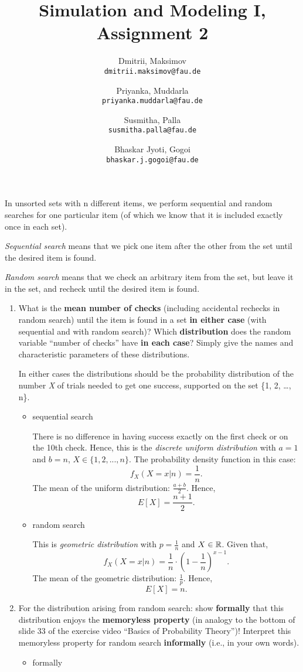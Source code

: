 \documentclass{homework}
\title{Simulation and Modeling I, Assignment 2}
\author{
  Dmitrii, Maksimov\\
  \texttt{dmitrii.maksimov@fau.de}
  \and
  Priyanka, Muddarla\\
  \texttt{priyanka.muddarla@fau.de}
  \and
  Susmitha, Palla\\
  \texttt{susmitha.palla@fau.de}
  \and
  Bhaskar Jyoti, Gogoi\\
  \texttt{bhaskar.j.gogoi@fau.de}
}
\begin{document}
\maketitle

\exercise
In unsorted sets with n different items, we perform sequential and random searches for one particular item (of which we know that it is included exactly once in each set).

\emph{Sequential search} means that we pick one item after the other from the set until the desired item is found.

\emph{Random search} means that we check an arbitrary item from the set, but leave it in the set, and recheck until the desired item is found.

\begin{enumerate}
	\item What is the \textbf{mean number of checks} (including accidental rechecks in random search) until the item is found in a set \textbf{in either case} (with sequential and with random search)? Which \textbf{distribution} does the random variable “number of checks” have \textbf{in each case}? Simply give the names and characteristic parameters of these distributions.

	In either cases the distributions should be the probability distribution of the number \emph{X} of trials needed to get one success, supported on the set \{1, 2, \dots, n\}.	
	\begin{itemize}
		\item sequential search
		
		There is no difference in having success exactly on the first check or on the 10th check. Hence, this is the \emph{discrete uniform distribution} with $a = 1$ and $b = n$, $X \in \{1, 2, ..., n\}$. The probability density function in this case: \[f_X(X = x|n) = \frac{1}{n}.\]
		The mean of the uniform distribution: $\frac{a+b}{2}$. Hence, \[E[X] = \frac{n+1}{2}.\]
		\item random search

		This is \emph{geometric distribution} with $p = \frac{1}{n}$ and $X \in \mathbb R$. Given that, \[f_X(X = x|n) = \frac{1}{n}\cdot (1 - \frac{1}{n}) ^ {x - 1}.\]
		The mean of the geometric distribution: $\frac{1}{p}$. Hence, \[E[X] = n.\]
	\end{itemize}
	\item For the distribution arising from random search: show \textbf{formally} that this distribution enjoys the \textbf{memoryless property} (in analogy to the bottom of slide 33 of the exercise video “Basics of Probability Theory”)! Interpret this memoryless property for random search \textbf{informally} (i.e., in your own words).
	\begin{itemize}
		\item formally


\end{itemize}
\end{enumerate}
\end{document}
